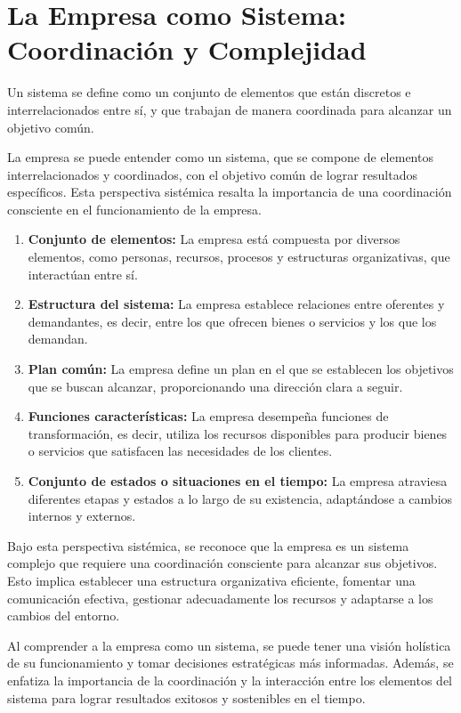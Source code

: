 \documentclass[
  man,
  floatsintext,
  longtable,
  a4paper,
  nolmodern,
  notxfonts,
  notimes,
  12pt,
  colorlinks=true,linkcolor=blue,citecolor=blue,urlcolor=blue]{apa7}
\begin{document}
\section{La Empresa como Sistema: Coordinación y
Complejidad}\label{la-empresa-como-sistema-coordinaciuxf3n-y-complejidad}

Un sistema se define como un conjunto de elementos que están discretos e
interrelacionados entre sí, y que trabajan de manera coordinada para
alcanzar un objetivo común.

La empresa se puede entender como un sistema, que se compone de
elementos interrelacionados y coordinados, con el objetivo común de
lograr resultados específicos. Esta perspectiva sistémica resalta la
importancia de una coordinación consciente en el funcionamiento de la
empresa.

\begin{enumerate}
\def\labelenumi{\arabic{enumi}.}
\item
  \textbf{Conjunto de elementos:} La empresa está compuesta por diversos
  elementos, como personas, recursos, procesos y estructuras
  organizativas, que interactúan entre sí.
\item
  \textbf{Estructura del sistema:} La empresa establece relaciones entre
  oferentes y demandantes, es decir, entre los que ofrecen bienes o
  servicios y los que los demandan.
\item
  \textbf{Plan común:} La empresa define un plan en el que se establecen
  los objetivos que se buscan alcanzar, proporcionando una dirección
  clara a seguir.
\item
  \textbf{Funciones características:} La empresa desempeña funciones de
  transformación, es decir, utiliza los recursos disponibles para
  producir bienes o servicios que satisfacen las necesidades de los
  clientes.
\item
  \textbf{Conjunto de estados o situaciones en el tiempo:} La empresa
  atraviesa diferentes etapas y estados a lo largo de su existencia,
  adaptándose a cambios internos y externos.
\end{enumerate}

Bajo esta perspectiva sistémica, se reconoce que la empresa es un
sistema complejo que requiere una coordinación consciente para alcanzar
sus objetivos. Esto implica establecer una estructura organizativa
eficiente, fomentar una comunicación efectiva, gestionar adecuadamente
los recursos y adaptarse a los cambios del entorno.

Al comprender a la empresa como un sistema, se puede tener una visión
holística de su funcionamiento y tomar decisiones estratégicas más
informadas. Además, se enfatiza la importancia de la coordinación y la
interacción entre los elementos del sistema para lograr resultados
exitosos y sostenibles en el tiempo.
\end{document}
